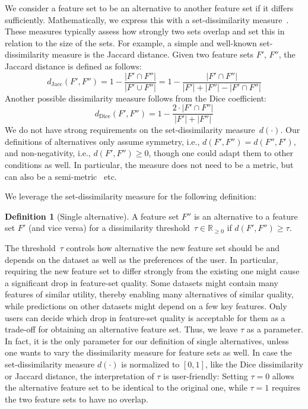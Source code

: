 \documentclass{article}
\theoremstyle{definition}
\newtheorem{definition}[corollary]{Definition}
\begin{document}
We consider a feature set to be an alternative to another feature set if it differs sufficiently.
Mathematically, we express this with a set-dissimilarity measure~\cite{choi2010survey, egghe2009new}.
These measures typically assess how strongly two sets overlap and set this in relation to the size of the sets.
For example, a simple and well-known set-dissimilarity measure is the Jaccard distance.
Given two feature sets $F'$, $F''$, the Jaccard distance is defined as follows:
%
\begin{equation}
	d_{\text{Jacc}}(F',F'') = 1 - \frac{|F' \cap F''|}{|F' \cup F''|} = 1 - \frac{|F' \cap F''|}{|F'| + |F''| - |F' \cap F''|}
	\label{eq:afs:jaccard}
\end{equation}
%
Another possible dissimilarity measure follows from the Dice coefficient:
%
\begin{equation}
	d_{\text{Dice}}(F',F'') = 1 - \frac{2 \cdot |F' \cap F''|}{|F'| + |F''|}
	\label{eq:afs:dice}
\end{equation}
%
We do not have strong requirements on the set-dissimilarity measure~$d(\cdot)$.
Our definitions of alternatives only assume symmetry, i.e., $d(F',F'')=d(F'',F')$, and non-negativity, i.e., $d(F',F'') \geq 0$, though one could adapt them to other conditions as well.
In particular, the measure does not need to be a metric, but can also be a semi-metric~\cite{wilson1931semi} etc.

We leverage the set-dissimilarity measure for the following definition:
%
\begin{definition}[Single alternative]
	A feature set $F''$ is an alternative to a feature set $F'$ (and vice versa) for a dissimilarity threshold~$\tau \in \mathbb{R}_{\geq 0}$ if $d(F',F'') \geq \tau$.
	\label{def:afs:single-alternative}
\end{definition}
%
The threshold~$\tau$ controls how alternative the new feature set should be and depends on the dataset as well as the preferences of the user.
In particular, requiring the new feature set to differ strongly from the existing one might cause a significant drop in feature-set quality.
Some datasets might contain many features of similar utility, thereby enabling many alternatives of similar quality, while predictions on other datasets might depend on a few key features.
Only users can decide which drop in feature-set quality is acceptable for them as a trade-off for obtaining an alternative feature set.
Thus, we leave $\tau$ as a parameter.
In fact, it is the only parameter for our definition of single alternatives, unless one wants to vary the dissimilarity measure for feature sets as well.
In case the set-dissimilarity measure $d(\cdot)$ is normalized to $[0,1]$, like the Dice dissimilarity or Jaccard distance, the interpretation of $\tau$ is user-friendly:
Setting $\tau=0$ allows the alternative feature set to be identical to the original one, while $\tau=1$ requires the two feature sets to have no overlap.
\end{document}
